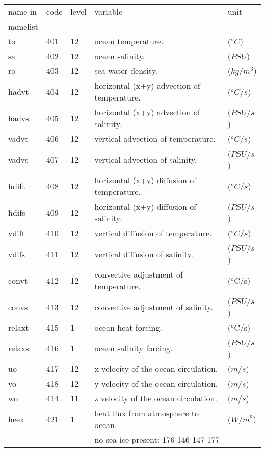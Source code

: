 \begin{tabular}{lllll}
name in & code   & level   &variable		  	        &    unit       \\
namelist  \\
\hline  
 to     &   401   &  12	&ocean temperature.	                &    ($^oC$)    \\
 sa     &   402   &  12	&ocean salinity.	                &    ($PSU$)    \\
 ro     &   403   &  12	&sea water density.	                &    ($kg/m^3$) \\
 hadvt  &   404   &  12	&horizontal (x+y) advection of temperature.& ($^oC/s$)  \\
 hadvs  &   405   &  12	&horizontal (x+y) advection of salinity.&    ($PSU/s$)  \\
 vadvt  &   406   &  12	&vertical advection of temperature.	&    ($^oC/s$)  \\
 vadvs  &   407   &  12	&vertical advection of salinity.	&    ($PSU/s$)  \\
 hdift  &   408   &  12	&horizontal (x+y) diffusion of temperature.& ($^oC/s$)  \\
 hdifs  &   409   &  12	&horizontal (x+y) diffusion of salinity.&    ($PSU/s$)  \\
 vdift  &   410   &  12	&vertical diffusion of temperature.	&    ($^oC/s$)  \\
 vdifs  &   411   &  12	&vertical diffusion of salinity.	&    ($PSU/s$)  \\
 convt  &   412   &  12	&convective adjustment of temperature.	&    ($^o$C/s)  \\
 convs  &   413   &  12	&convective adjustment of salinity.	&    ($PSU/s$)  \\
 relaxt &   415   &  1  &ocean heat forcing.                    &    ($^o$C/s)  \\
 relaxs &   416   &  1  &ocean salinity forcing.                &    ($PSU/s$)  \\
 uo     &   417   &  12	&x velocity of the ocean circulation.	&    ($m/s$)    \\
 vo     &   418   &  12	&y velocity of the ocean circulation.	&    ($m/s$)    \\
 wo     &   414   &  11	&z velocity of the ocean circulation.	&    ($m/s$)    \\
 heex   &   421   &  1  &heat flux from atmosphere to ocean.    &    ($W/m^2$)  \\
        &         &     &no sea-ice present: 176-146-147-177      &             \\

\end{tabular}
